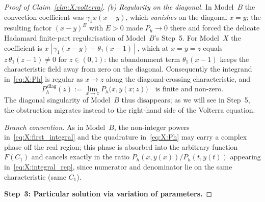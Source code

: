 \begin{proof}[Proof of Claim~\ref{clm:X:volterra}]
\smallskip\noindent\textit{(b) Regularity on the diagonal.}
In Model~$B$ the convection coefficient was $\gamma_1 x(x-y)$, which \emph{vanishes} on
the diagonal $x=y$; the resulting factor $(x-y)^{E}$ with $E>0$ made $P_h\to0$ there and
forced the delicate Hadamard finite-part regularisation of Model~$B$'s Step~5. For
Model~$X$ the coefficient is $x[\gamma_1(x-y)+\theta_1(x-1)]$, which at $x=y=z$ equals
$z\,\theta_1(z-1)\neq0$ for $z\in(0,1)$: the abandonment term $\theta_1(x-1)$ keeps the
characteristic field away from zero on the diagonal. Consequently the integrand
in~\eqref{eq:X:Ph} is regular as $x\to z$ along the diagonal-crossing characteristic, and
\begin{equation}
    P_h^{\,\mathrm{diag}}(z):=\lim_{x\to z}P_h\bigl(x,y(x;z)\bigr)
    \quad\text{is finite and non-zero.}
    \label{eq:X:Ph_diag}
\end{equation}
The diagonal singularity of Model~$B$ thus disappears; as we will see in Step~5, the
obstruction migrates instead to the right-hand side of the Volterra equation.

\smallskip\noindent\textit{Branch convention.}
As in Model~$B$, the non-integer powers in~\eqref{eq:X:first_integral} and the quadrature
in~\eqref{eq:X:Ph} may carry a complex phase off the real region; this phase is absorbed
into the arbitrary function $F(C_1)$ and cancels exactly in the ratio
$P_h(x,y(x))/P_h(t,y(t))$ appearing in~\eqref{eq:X:integral_rep}, since numerator and
denominator lie on the same characteristic (same $C_1$).

\medskip\noindent\textbf{Step~3: Particular solution via variation of parameters.}


\end{proof}
